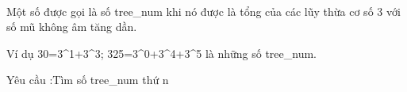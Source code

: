  

Một số được gọi là số tree\_num khi nó được là tổng của các lũy thừa cơ số 3 với số mũ không âm tăng dần.

Ví dụ 30=3^1+3^3; 325=3^0+3^4+3^5 là những số tree\_num.

Yêu cầu :Tìm số tree\_num thứ n

 

\